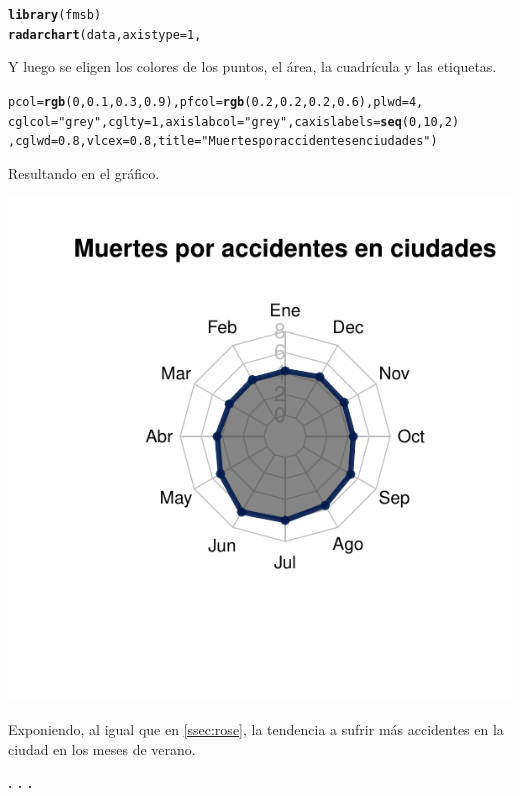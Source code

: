 \documentclass{article}\usepackage[]{graphicx}\usepackage[]{color}
\makeatletter
\def\maxwidth{ %
  \ifdim\Gin@nat@width>\linewidth
    \linewidth
  \else
    \Gin@nat@width
  \fi
}
\newcommand{\hlstr}[1]{\textcolor[rgb]{0.192,0.494,0.8}{#1}}%
\newcommand{\hlkwd}[1]{\textcolor[rgb]{0.737,0.353,0.396}{\textbf{#1}}}%
\newenvironment{kframe}{%
 \def\at@end@of@kframe{}%
 \ifinner\ifhmode%
  \def\at@end@of@kframe{\end{minipage}}%
  \begin{minipage}{\columnwidth}%
 \fi\fi%
 \def\FrameCommand##1{\hskip\@totalleftmargin \hskip-\fboxsep
 \colorbox{shadecolor}{##1}\hskip-\fboxsep
     \hskip-\linewidth \hskip-\@totalleftmargin \hskip\columnwidth}%
 \MakeFramed {\advance\hsize-\width
   \@totalleftmargin\z@ \linewidth\hsize
   \@setminipage}}%
 {\par\unskip\endMakeFramed%
 \at@end@of@kframe}
\newenvironment{knitrout}{}{} %
\makeatother
\begin{document}
\begin{knitrout}
\color{fgcolor}\begin{kframe}
\begin{alltt}
\hlkwd{library}(fmsb)
\hlkwd{radarchart}( data  , axistype=1 ,
\end{alltt}
\end{kframe}
\end{knitrout}
Y luego se eligen los colores de los puntos, el \'area, la cuadr\'icula y las etiquetas.
\begin{knitrout}
\color{fgcolor}\begin{kframe}
\begin{alltt}
            pcol=\hlkwd{rgb}(0,0.1,0.3,0.9) , pfcol=\hlkwd{rgb}(0.2,0.2,0.2,0.6) , plwd=4 ,
            cglcol=\hlstr{"grey"}, cglty=1, axislabcol=\hlstr{"grey"}, caxislabels=\hlkwd{seq}(0,10,2)
            , cglwd=0.8, vlcex=0.8, title = \hlstr{"Muertes por accidentes en ciudades"} )
\end{alltt}
\end{kframe}
\end{knitrout}
\clearpage
Resultando en el gr\'afico.
\begin{knitrout}
\color{fgcolor}

{\centering \includegraphics[width=\maxwidth]{figure/plot_fmsb-1} 

}



\end{knitrout}
Exponiendo, al igual que en \ref{ssec:rose}, la tendencia a sufrir m\'as accidentes en la ciudad en los meses de verano.
\begin{center}
\textbf{. . .}
\end{center}
\end{document}
